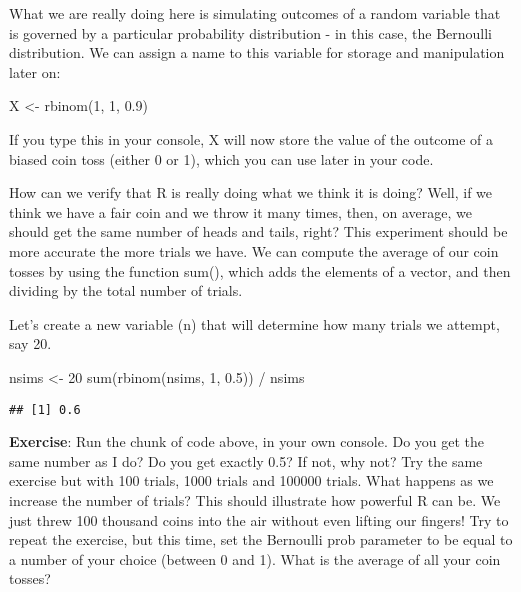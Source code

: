 \documentclass[
]{book}
\newenvironment{Shaded}{\begin{snugshade}}{\end{snugshade}}
\newcommand{\DecValTok}[1]{\textcolor[rgb]{0.00,0.00,0.81}{#1}}
\newcommand{\FloatTok}[1]{\textcolor[rgb]{0.00,0.00,0.81}{#1}}
\newcommand{\FunctionTok}[1]{\textcolor[rgb]{0.00,0.00,0.00}{#1}}
\newcommand{\NormalTok}[1]{#1}
\newcommand{\OtherTok}[1]{\textcolor[rgb]{0.56,0.35,0.01}{#1}}
\newcommand{\SpecialCharTok}[1]{\textcolor[rgb]{0.00,0.00,0.00}{#1}}
\begin{document}
What we are really doing here is simulating outcomes of a random variable that is governed by a particular probability distribution - in this case, the Bernoulli distribution. We can assign a name to this variable for storage and manipulation later on:

\begin{Shaded}
\begin{Highlighting}[]
\NormalTok{X }\OtherTok{\textless{}{-}} \FunctionTok{rbinom}\NormalTok{(}\DecValTok{1}\NormalTok{, }\DecValTok{1}\NormalTok{, }\FloatTok{0.9}\NormalTok{)}
\end{Highlighting}
\end{Shaded}

If you type this in your console, X will now store the value of the outcome of a biased coin toss (either 0 or 1), which you can use later in your code.

How can we verify that R is really doing what we think it is doing? Well, if we think we have a fair coin and we throw it many times, then, on average, we should get the same number of heads and tails, right? This experiment should be more accurate the more trials we have. We can compute the average of our coin tosses by using the function sum(), which adds the elements of a vector, and then dividing by the total number of trials.

Let's create a new variable (n) that will determine how many trials we attempt, say 20.

\begin{Shaded}
\begin{Highlighting}[]
\NormalTok{nsims }\OtherTok{\textless{}{-}} \DecValTok{20}
\FunctionTok{sum}\NormalTok{(}\FunctionTok{rbinom}\NormalTok{(nsims, }\DecValTok{1}\NormalTok{, }\FloatTok{0.5}\NormalTok{)) }\SpecialCharTok{/}\NormalTok{ nsims}
\end{Highlighting}
\end{Shaded}

\begin{verbatim}
## [1] 0.6
\end{verbatim}

\textbf{Exercise}: Run the chunk of code above, in your own console. Do you get the same number as I do? Do you get exactly 0.5? If not, why not? Try the same exercise but with 100 trials, 1000 trials and 100000 trials. What happens as we increase the number of trials? This should illustrate how powerful R can be. We just threw 100 thousand coins into the air without even lifting our fingers! Try to repeat the exercise, but this time, set the Bernoulli prob parameter to be equal to a number of your choice (between 0 and 1). What is the average of all your coin tosses?
\end{document}

